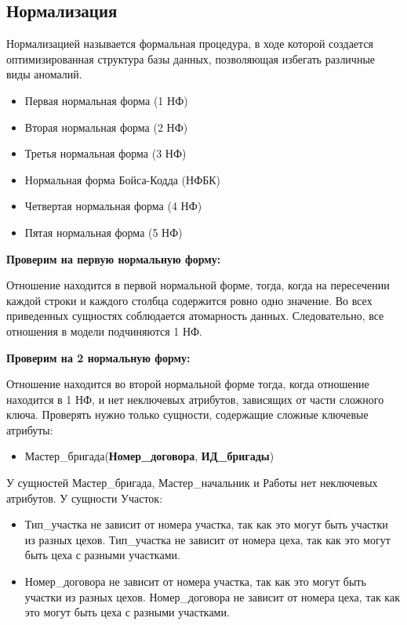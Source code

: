 \subsection {Нормализация}
Нормализацией называется формальная процедура, в ходе которой создается оптимизированная структура базы данных, позволяющая избегать различные виды аномалий.

\begin{itemize}
    \item Первая нормальная форма (1 НФ)
    \item Вторая нормальная форма (2 НФ)
    \item Третья нормальная форма (3 НФ)
    \item Нормальная форма Бойса-Кодда (НФБК)
    \item Четвертая нормальная форма (4 НФ)
    \item Пятая нормальная форма (5 НФ)
\end{itemize}

{\bf Проверим на первую нормальную форму:}

Отношение находится в первой нормальной форме, тогда, когда на пересечении каждой строки и каждого столбца содержится ровно одно значение.
Во всех приведенных сущностях соблюдается атомарность данных.
Следовательно, все отношения в модели подчиняются 1 НФ.

{\bf Проверим на 2 нормальную форму:}

Отношение находится во второй нормальной форме тогда, когда отношение находится в 1 НФ, и нет неключевых атрибутов, зависящих от части сложного ключа.
Проверять нужно только сущности, содержащие сложные ключевые атрибуты:

\begin{itemize}

    \item Мастер\_бригада({\bf Номер\_договора}, {\bf ИД\_бригады})

\end{itemize}

У сущностей Мастер\_бригада, Мастер\_начальник и Работы нет неключевых атрибутов.
У сущности Участок:
\begin{itemize}

    \item Тип\_участка не зависит от номера участка, так как это могут быть участки из разных цехов.
    Тип\_участка не зависит от номера цеха, так как это могут быть цеха с разными участками.
    \item Номер\_договора не зависит от номера участка, так как это могут быть участки из разных цехов.
    Номер\_договора не зависит от номера цеха, так как это могут быть цеха с разными участками.

\end{itemize}

